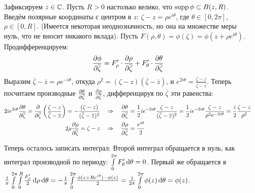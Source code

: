 \documentclass[a4paper]{report}
\begin{document}
{{{            Зафиксируем $z \in \mathbb{C}$.
            Пусть $R > 0$ настолько велико, что $\operatorname{supp} \phi \subset B(z, R)$.
            Введём полярные координаты с центром в $z$: $\zeta - z = \rho e^{i\theta}$, где $\theta \in [0, 2\pi]$, $\rho \in [0, R]$.
            (Имеется некоторая неоднозначность, но она на множестве меры нуль, что не вносит никакого вклада).
        Пусть $F(\rho, \theta) = \phi(\zeta) = \phi(z + \rho e^{i\theta})$.
            Продифференцируем:
        \[\frac{\partial \phi}{\partial \overline{\zeta}} = F'_\rho \cdot \frac{\partial \rho}{\partial \overline{\zeta}} + F'_\theta \cdot \frac{\partial \theta}{\partial \overline{\zeta}}\]
        Выразим $\overline{\zeta} - \overline{z} = \rho e^{-i\theta}$, откуда $\rho^2 = (\zeta - z)(\overline{\zeta} - \overline{z})$, и $e^{2i\theta} = \frac{\zeta - z}{\overline{\zeta} - \overline{z}}$.
        Теперь посчитаем производные $\frac{\partial \theta}{\partial \overline{\zeta}}$ и $\frac{\partial \rho}{\partial \overline{\zeta}}$, дифференцируя по $\overline{\zeta}$ эти равенства:
            \begin{align*}
                2i e^{2i\theta}\frac{\partial \theta}{\partial \overline{\zeta}} = \frac{\partial }{\partial \overline{\zeta}}\left(\frac{\zeta - z}{\overline{\zeta} - \overline{z}}\right) = -\frac{(\zeta - z)}{(\overline{\zeta} - \overline{z})^2}  \quad&\Rightarrow\quad \frac{\partial \theta}{\partial \overline{\zeta}} = \frac{1}{2}i e^{-2i\theta} \frac{\zeta - z}{(\overline{\zeta} - \overline{z})^2} = \frac{1}{2}i e^{-2i\theta} \frac{\zeta - z}{\rho^2 e^{-2i\theta}} = \frac{i}{2}\frac{\zeta - z}{\rho^2}\\
                2\rho\frac{\partial \rho}{\partial \overline{\zeta}} = \zeta - z \quad&\Rightarrow\quad \frac{\partial \rho}{\partial \overline{\zeta}} = \frac{e^{i\theta}}{2}
            \end{align*}

        Теперь осталось записать интеграл:
        Второй интеграл обращается в нуль, как интеграл производной по периоду: $\int\limits_0^{2\pi}F'_{\theta}\operatorname{d}\!\theta = 0$.
        Первый же обращается в $\frac{1}{\pi}\int\limits_0^{2\pi}\int\limits_0^{R}\frac{F'_{\rho}}{2}\operatorname{d}\!\rho\operatorname{d}\!\theta = -\frac{1}{\pi}\int\limits_0^{2\pi}\frac{\phi(z + Re^{i\theta}) - \phi(z)}{2} = \frac{1}{2\pi}\int\limits_0^{2\pi}\phi(z)\operatorname{d}\!\theta = \phi(z)$.\qedhere

}}}
\end{document}
